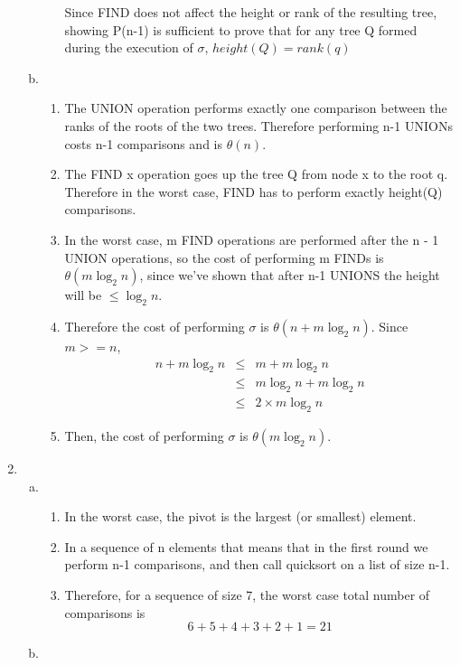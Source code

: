 \documentclass[11pt]{article}
\begin{document}
\begin{enumerate}
\begin{enumerate}[a)]
\begin{itemize}
	
	Since FIND does not affect the height or rank of the resulting tree, showing P(n-1) is sufficient to prove
	that for any tree Q formed during the execution of $\sigma$, $height(Q) = rank(q)$
					\end{itemize}
				\item 
					\begin{enumerate}[$\circ$]
						\item The UNION operation performs exactly one comparison between the ranks of the roots of the two trees. Therefore performing n-1 UNIONs costs n-1 comparisons and is $\theta(n)$.
						\item The FIND x operation goes up the tree Q from node x to the root q. Therefore in the worst case, FIND has to perform exactly height(Q) comparisons.
						\item In the worst case, m FIND operations are performed after the n - 1 UNION operations,
		so the cost of performing m FINDs is $\theta(m \log_2 n)$, since we've shown that after
		n-1 UNIONS the height will be $\le \log_2 n$.
						\item Therefore the cost of performing $\sigma$ is $\theta(n + m \log_2 n)$. Since $m >= n$,
						\begin{eqnarray*}
											n + m \log_2 n & \le & m + m \log_2 n  \\
											& \le & m \log_2 n + m \log_2 n \\
											& \le & 2 \times m \log_2 n 
						\end{eqnarray*}
						\item Then, the cost of performing $\sigma$ is $\theta(m \log_2 n)$.
					\end{enumerate}
		\end{enumerate}
		\item %
			\begin{enumerate}[a)]
				\item %
					\begin{enumerate}[$\circ$]
						\item In the worst case, the pivot is the largest (or smallest) element. 
						\item In a sequence of n elements that means that in the first round we perform
n-1 comparisons, and then call quicksort on a list of size n-1. 
						\item Therefore, for a sequence of size 7, the worst case total number of comparisons is
$$6+5+4+3+2+1 = 21$$
					\end{enumerate}
				\item %

\end{enumerate}
\end{enumerate}
\end{document}
